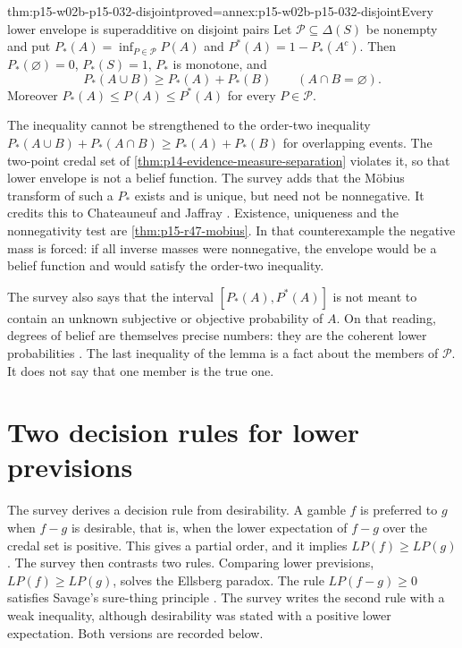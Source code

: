 \begin{hblemma}{thm:p15-w02b-p15-032-disjoint}{proved=annex:p15-w02b-p15-032-disjoint}{Every lower envelope is superadditive on disjoint pairs}
Let \(\mathcal P\subseteq\Delta(S)\) be nonempty and put
\(P_*(A)=\inf_{P\in\mathcal P}P(A)\) and \(P^*(A)=1-P_*(A^c)\). Then
\(P_*(\varnothing)=0\), \(P_*(S)=1\), \(P_*\) is monotone, and
\[
 P_*(A\cup B)\geq P_*(A)+P_*(B)\qquad(A\cap B=\varnothing).
\]
Moreover \(P_*(A)\leq P(A)\leq P^*(A)\) for every \(P\in\mathcal P\).
\end{hblemma}

The inequality cannot be strengthened to the order-two inequality
\(P_*(A\cup B)+P_*(A\cap B)\geq P_*(A)+P_*(B)\) for overlapping events. The
two-point credal set of \cref{thm:p14-evidence-measure-separation} violates
it, so that lower envelope is not a belief function. The survey adds that
the M\"obius transform of such a \(P_*\) exists and is unique, but need not be
nonnegative. It credits this to Chateauneuf and Jaffray
\cite{R47ChateauneufJaffray1989}. Existence, uniqueness and the
nonnegativity test are \cref{thm:p15-r47-mobius}. In that counterexample the
negative mass is forced: if all inverse masses were nonnegative, the envelope
would be a belief function and would satisfy the order-two inequality.

The survey also says that the interval \([P_*(A),P^*(A)]\) is not meant to
contain an unknown subjective or objective probability of \(A\). On that
reading, degrees of belief are themselves precise numbers: they are the
coherent lower probabilities \cite[p.~313]{DuboisPrade2021RepresentingBelief}.
The last inequality of the lemma is a fact about the members of
\(\mathcal P\). It does not say that one member is the true one.

\section{Two decision rules for lower previsions}
\label{sec:p15-w02b-p15-032-decision}

The survey derives a decision rule from desirability. A gamble \(f\) is
preferred to \(g\) when \(f-g\) is desirable, that is, when the lower
expectation of \(f-g\) over the credal set is positive. This gives a
partial order, and it implies \(LP(f)\geq LP(g)\). The survey then contrasts
two rules. Comparing lower previsions, \(LP(f)\geq LP(g)\), solves the
Ellsberg paradox. The rule \(LP(f-g)\geq0\) satisfies Savage's sure-thing
principle \cite[p.~313]{DuboisPrade2021RepresentingBelief}. The survey writes
the second rule with a weak inequality, although desirability was stated with
a positive lower expectation. Both versions are recorded below.

